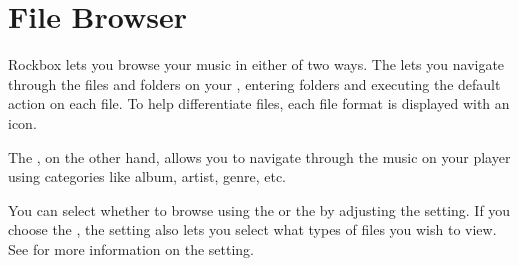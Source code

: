 \section{\label{ref:file_browser}File Browser}
Rockbox lets you browse your music in either of two ways. The 
 lets you navigate through the files and folders on 
your \dap, entering folders and executing the default action on each file.
To help differentiate files, each file format is displayed with an icon. 

The , on the other hand, allows you to navigate 
through the music on your player using categories like album, artist, genre,
etc.

You can select whether to browse using the  or the 
 by adjusting the  setting.  
If you choose the , the  setting also
lets you select what types of files you wish to view.  See 
 for more information on the 
setting.



